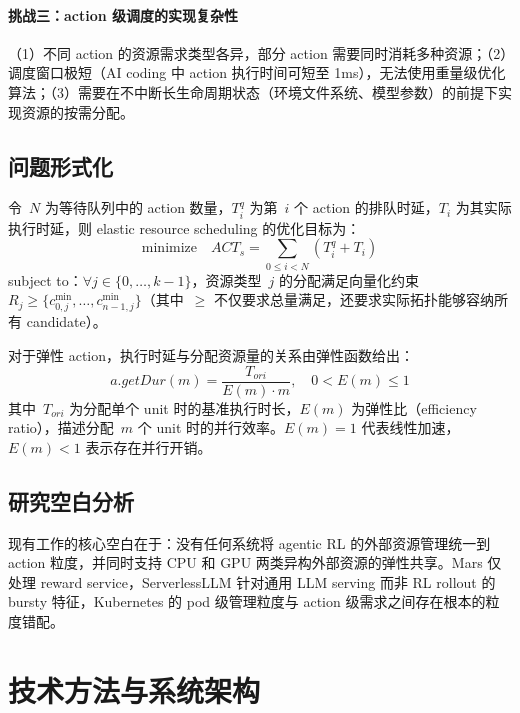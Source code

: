 \documentclass[11pt, a4paper]{article}
\begin{document}
\paragraph{挑战三：action 级调度的实现复杂性}
（1）不同 action 的资源需求类型各异，部分 action 需要同时消耗多种资源；（2）调度窗口极短（AI coding 中 action 执行时间可短至 1ms），无法使用重量级优化算法；（3）需要在不中断长生命周期状态（环境文件系统、模型参数）的前提下实现资源的按需分配。

\subsection{问题形式化}

\begin{mathbox}
令~$N$ 为等待队列中的 action 数量，$T_i^q$ 为第~$i$ 个 action 的排队时延，$T_i$ 为其实际执行时延，则 elastic resource scheduling 的优化目标为：
\begin{equation}
  \text{minimize} \quad \mathit{ACT}_s = \sum_{0 \leq i < N} \left( T_i^q + T_i \right)
  \label{eq:act}
\end{equation}
subject to：$\forall j \in \{0, \ldots, k-1\}$，资源类型~$j$ 的分配满足向量化约束~$R_j \geq \{c^{\min}_{0,j}, \ldots, c^{\min}_{n-1,j}\}$（其中~$\geq$ 不仅要求总量满足，还要求实际拓扑能够容纳所有 candidate）。
\end{mathbox}

对于弹性 action，执行时延与分配资源量的关系由弹性函数给出：
\begin{equation}
  a.\mathit{getDur}(m) = \frac{T_{\mathit{ori}}}{E(m) \cdot m}, \quad 0 < E(m) \leq 1
  \label{eq:elasticity}
\end{equation}
其中~$T_{\mathit{ori}}$ 为分配单个 unit 时的基准执行时长，$E(m)$ 为弹性比（efficiency ratio），描述分配~$m$ 个 unit 时的并行效率。$E(m) = 1$ 代表线性加速，$E(m) < 1$ 表示存在并行开销。

\subsection{研究空白分析}

现有工作的核心空白在于：没有任何系统将 agentic RL 的外部资源管理统一到 action 粒度，并同时支持 CPU 和 GPU 两类异构外部资源的弹性共享。Mars 仅处理 reward service，ServerlessLLM 针对通用 LLM serving 而非 RL rollout 的 bursty 特征，Kubernetes 的 pod 级管理粒度与 action 级需求之间存在根本的粒度错配。

\section{技术方法与系统架构}
\end{document}
